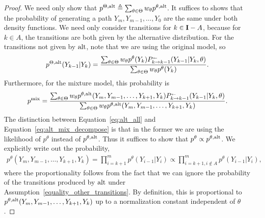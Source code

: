 \begin{proof}
We need only show that $p^{\Theta,\mathrm{alt}}\triangleq \sum_{\theta \in \Theta} w_\theta p^{\theta,\mathrm{alt}}$. It suffices to shows that the probability of generating a path $Y_m,Y_{m-1},\dots,Y_0$ are the same under both density functions. We need only consider  transitions for $k \in \mathbf{I}-A$, because for $k \in A$, the transitions are both given by the alternative distribution. For the transitions not given by $\mathrm{alt}$, note that we are using the original model, so 
\begin{align}
p^{\Theta,\alt}(Y_{k-1}|Y_k) = \frac{\sum_{\theta \in \Theta }w_\theta p^\theta(Y_k) \kernelreverse[]_{k\to k-1} (Y_{k-1}|Y_{k},\theta)}{\sum_{\theta \in \Theta}w_\theta p^\theta(Y_k)}.\label{eq:alt_all}
\end{align}
Furthermore, for the mixture model, this probability is 
\begin{align}
p^{\mathrm{mix}} = \frac{\sum_{\theta \in \Theta }w_\theta p^{\theta,\alt}(Y_m,Y_{m-1},\dots,Y_{k+1},Y_k) \kernelreverse[]_{k\to k-1} (Y_{k-1}|Y_{k},\theta)}{\sum_{\theta \in \Theta}w_\theta p^{\theta,\alt}(Y_m,Y_{m-1},\dots,Y_{k+1},Y_k)}.\label{eq:alt_mix_decompose}
\end{align}
The distinction between Equation~\ref{eq:alt_all} and Equation~\ref{eq:alt_mix_decompose} is that in the former we are using the likelihood of $p^\theta$ instead of   $p^{\theta,\mathrm{alt}}$. Thus it suffices to show that $p^\theta \propto  p^{\theta,\mathrm{alt}}$. We explicitly write out the probability,
\begin{align*}
p^\theta(Y_m,Y_{m-1},\dots,Y_{k+1},Y_k) = \prod_{i=k+1}^m p^{\theta}(Y_{i-1}|Y_i) \propto \prod_{i=k+1, i\notin A}^m p^{\theta}(Y_{i-1}|Y_i), 
\end{align*}
where the proportionality follows from the fact that we can ignore the probability of the transitions produced by $\mathrm{alt}$ under Assumption~\ref{equality_other_transitions}. By definition, this is proportional to $p^{\theta,\mathrm{alt}}(Y_m,Y_{m-1},\dots,Y_{k+1},Y_k)$ up to a normalization constant independent of $\theta$. 
\end{proof}

